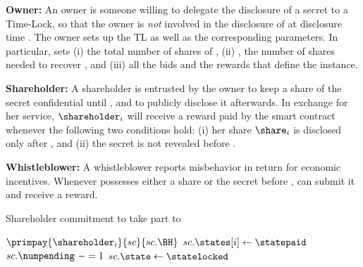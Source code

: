 \begin{asparaitem}
\item {\bf Owner:}	An owner \owner is someone willing to delegate the disclosure of a secret \secret to a Time-Lock, so that the owner is \textit{not} involved in the disclosure of \secret at disclosure time \td.
The owner \owner sets up the TL as well as the corresponding parameters.
In particular, \owner sets (i) \N the total number of shares \share of \secret, (ii) \K, the number of shares needed to recover \secret, and (iii) all the bids and the rewards that define the instance.


\item {\bf Shareholder:}
A shareholder \shareholder is entrusted by the owner \owner to keep a share \share of the secret \secret confidential until \td, and to publicly disclose it afterwards.
In exchange for her service, $\shareholder_{i}$ will receive a reward paid by the smart contract whenever the following two conditions hold: (i) her share $\share_{i}$ is disclosed only after \td, and (ii) the secret \secret is not revealed before \td.

\item {\bf Whistleblower:}
A whistleblower \whistleblower reports misbehavior in return for economic incentives.
Whenever \whistleblower possesses either a share \share or the secret \secret before \td, \whistleblower can submit it and receive a reward.
\end{asparaitem}


\begin{algorithm}[t]
	\caption{Shareholder commitment to take part to \shortname}\label{algo:shareholder_commitment}
	\begin{algorithmic}[1]
		\vspace{0.6em}
		\vspace*{0.6em}
		
		\State $\primpay{\shareholder_i}{sc}{sc.\BH}$
		\State $sc.\states[i]\gets \statepaid$
		\State $sc.\numpending\ -= 1$
		\State $sc.\state\gets \statelocked$
		\EndIf
		\EndIf
		\EndProcedure
	\end{algorithmic}
\end{algorithm}

